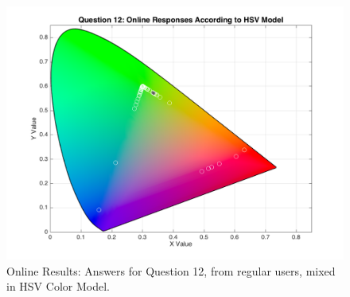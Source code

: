\begin{figure}[htbp]
\begin{minipage}{0.48\textwidth}
    \includegraphics[width=\textwidth]{images/12_online_HSVresponses.png}
    \caption[Online Results: Answers for Question 12, from regular users, mixed in HSV Color Model.]{Online Results: Answers for Question 12, from regular users, mixed in HSV Color Model.}
    \label{fig:onlinehsvregular_12}
  \end{minipage}
\end{figure}
%
